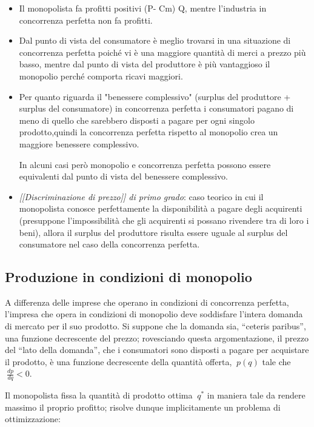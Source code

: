 \begin{itemize} %
 \item Il monopolista fa profitti positivi (P- Cm) Q, mentre l'industria in 
concorrenza perfetta non fa profitti.
 \item Dal punto di vista del consumatore è meglio trovarsi in una situazione 
di 
concorrenza perfetta poiché vi è una maggiore quantità di merci a prezzo più 
basso, mentre dal punto di vista del produttore è più vantaggioso il monopolio 
perché comporta ricavi maggiori.
 \item Per quanto riguarda il "benessere complessivo" (surplus del produttore + 
surplus del consumatore) in concorrenza perfetta i consumatori pagano di meno 
di quello che sarebbero disposti a pagare per ogni singolo prodotto,quindi la 
concorrenza perfetta rispetto al monopolio crea un maggiore benessere 
complessivo.

In alcuni casi però monopolio e concorrenza perfetta possono essere 
equivalenti dal punto di vista del benessere complessivo.
 \item \emph{[[Discriminazione di prezzo]] di primo grado}: caso teorico in cui 
il 
monopolista conosce perfettamente la disponibilità a pagare degli acquirenti 
(presuppone l'impossibilità che gli acquirenti si possano rivendere tra di loro 
i beni), allora il surplus del produttore risulta essere uguale al surplus del 
consumatore nel caso della concorrenza perfetta.
\end{itemize}

\subsection{Produzione in condizioni di monopolio}

A differenza delle imprese che operano in condizioni di concorrenza 
perfetta, l'impresa che opera in condizioni di monopolio deve soddisfare 
l'intera domanda di mercato per il suo prodotto. Si suppone che la domanda sia, 
``ceteris paribus'', una funzione decrescente del 
prezzo; rovesciando questa argomentazione, il prezzo del ``lato della 
domanda'', che i consumatori sono disposti a pagare per acquistare il prodotto, 
è una funzione decrescente della quantità offerta, 
\(\ p(q)\) tale che \(\ \frac{dp}{dq}<0\).

Il monopolista fissa la quantità di prodotto ottima \(\ q^{*}\) in 
maniera tale da rendere massimo il proprio profitto; risolve dunque 
implicitamente un problema di ottimizzazione:

